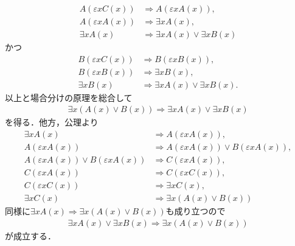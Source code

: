 \begin{prf}
		\begin{align}
			A(\varepsilon x C(x)) &\Longrightarrow A(\varepsilon x A(x)), \\
			A(\varepsilon x A(x)) &\Longrightarrow \exists x A(x), \\
			\exists x A(x) &\Longrightarrow \exists x A(x) \vee \exists x B(x)
		\end{align}
		かつ
		\begin{align}
			B(\varepsilon x C(x)) &\Longrightarrow B(\varepsilon x B(x)), \\
			B(\varepsilon x B(x)) &\Longrightarrow \exists x B(x), \\
			\exists x B(x) &\Longrightarrow \exists x A(x) \vee \exists x B(x).
		\end{align}
		以上と場合分けの原理を総合して
		\begin{align}
			\exists x ( A(x) \vee B(x) ) \Longrightarrow \exists x A(x) \vee \exists x B(x)
		\end{align}
		を得る．他方，公理より
		\begin{align}
			\exists x A(x) &\Longrightarrow A(\varepsilon x A(x)), \\
			A(\varepsilon x A(x)) &\Longrightarrow A(\varepsilon x A(x)) \vee B(\varepsilon x A(x)), \\
			A(\varepsilon x A(x)) \vee B(\varepsilon x A(x)) &\Longrightarrow C(\varepsilon x A(x)), \\
			C(\varepsilon x A(x)) &\Longrightarrow C(\varepsilon x C(x)), \\
			C(\varepsilon x C(x)) &\Longrightarrow \exists x C(x), \\
			\exists x C(x) &\Longrightarrow \exists x (A(x) \vee B(x))
		\end{align}
		同様に$\exists x A(x) \Longrightarrow \exists x (A(x) \vee B(x))$も成り立つので
		\begin{align}
			\exists x A(x) \vee \exists x B(x) \Longrightarrow \exists x (A(x) \vee B(x))
		\end{align}
		が成立する．
		\QED
	\end{prf}